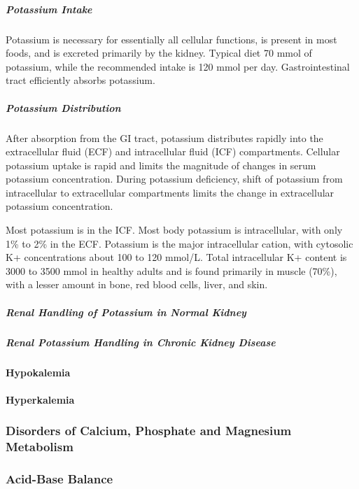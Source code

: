 \documentclass[
  letterpaper,
  DIV=11,
  numbers=noendperiod]{scrreprt}
\let\oldparagraph\paragraph
\renewcommand{\paragraph}[1]{\oldparagraph{#1}\mbox{}}
\let\oldsubparagraph\subparagraph
\renewcommand{\subparagraph}[1]{\oldsubparagraph{#1}\mbox{}}
\begin{document}
\subparagraph{Potassium Intake}\label{potassium-intake}

Potassium is necessary for essentially all cellular functions, is
present in most foods, and is excreted primarily by the kidney. Typical
diet 70 mmol of potassium, while the recommended intake is 120 mmol per
day. Gastrointestinal tract efficiently absorbs potassium.

\subparagraph{Potassium Distribution}\label{potassium-distribution}

After absorption from the GI tract, potassium distributes rapidly into
the extracellular fluid (ECF) and intracellular fluid (ICF)
compartments. Cellular potassium uptake is rapid and limits the
magnitude of changes in serum potassium concentration. During potassium
deficiency, shift of potassium from intracellular to extracellular
compartments limits the change in extracellular potassium concentration.

Most potassium is in the ICF. Most body potassium is intracellular, with
only 1\% to 2\% in the ECF. Potassium is the major intracellular cation,
with cytosolic K+ concentrations about 100 to 120 mmol/L. Total
intracellular K+ content is 3000 to 3500 mmol in healthy adults and is
found primarily in muscle (70\%), with a lesser amount in bone, red
blood cells, liver, and skin.

\subparagraph{Renal Handling of Potassium in Normal
Kidney}\label{renal-handling-of-potassium-in-normal-kidney}

\subparagraph{Renal Potassium Handling in Chronic Kidney
Disease}\label{renal-potassium-handling-in-chronic-kidney-disease}

\paragraph{Hypokalemia}\label{hypokalemia}

\paragraph{Hyperkalemia}\label{hyperkalemia}

\subsubsection{Disorders of Calcium, Phosphate and Magnesium
Metabolism}\label{disorders-of-calcium-phosphate-and-magnesium-metabolism}

\subsubsection{Acid-Base Balance}\label{acid-base-balance}
\end{document}
